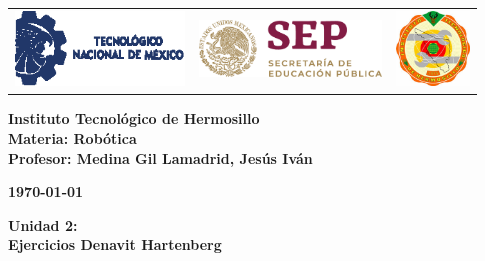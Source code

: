 \begin{titlepage}
	\centering
	\begin{tabular}{@{}p{} p{} p{}@{}}
		\includegraphics[height=2cm]{tecnm} & 
		\centering \includegraphics[height=1.5cm]{SEP} & 
		\raggedleft \includegraphics[height=2cm]{ith.jpg} \\
	\end{tabular}
	
	\vspace{2em}
	
	\noindent
	\begin{minipage}[t]{0.48\textwidth}
		\raggedright
		\small \textbf{%
			Instituto Tecnológico de Hermosillo\\
			Materia: Robótica\\
			Profesor: Medina Gil Lamadrid, Jesús Iván%
		}
	\end{minipage}%
	\hfill
	\begin{minipage}[t]{0.48\textwidth}
		\raggedleft
		\small \textbf{\today}
	\end{minipage}
	
	\vspace{2em}
	
	{\large \textbf{Unidad 2: }}\\
	{\Huge \textbf{Ejercicios Denavit Hartenberg}}
		
	\vspace{1em}
	

\end{titlepage}
